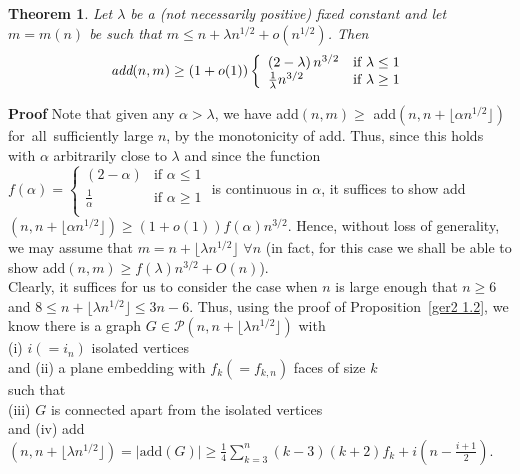 \documentclass{article}
\newtheorem{Theorem}{Theorem}
\newtheorem{Proof of Theorem}{Proof of Theorem}
\begin{document}
\begin{Theorem} \label{add3}
Let $\lambda$ be a (not necessarily positive) fixed constant and 
let $m=m(n)$ be such that $m \leq n + \lambda n^{1/2} + o(n^{1/2})$. 
Then
\begin{displaymath}
\emph{add}(n,m) \geq (1+o(1))
\left\{ \begin{array}{ll}
\left( 2 - \lambda \right) n^{3/2} & \textrm{if } \lambda \leq 1 \\
\frac{1}{\lambda} n^{3/2} & \textrm{if } \lambda \geq 1 \\
\end{array} \right. 
\end{displaymath}
\end{Theorem}
\textbf{Proof} 
Note that given any $\alpha > \lambda$, 
we have add$(n,m) \geq$ add$(n,n + \lfloor \alpha n^{1/2} \rfloor )$
for~all~sufficiently large $n$,
by the monotonicity of add.
Thus, since this holds with $\alpha$ arbitrarily close to $\lambda$ and since 
the function
$f(\alpha) = \left\{ \begin{array}{ll}
\left( 2 - \alpha \right) & \textrm{if } \alpha \leq 1 \\
\frac{1}{\alpha} & \textrm{if } \alpha \geq 1 \\
\end{array} \right.$
is continuous in $\alpha$,
it suffices to show add$(n,n + \lfloor \alpha n^{1/2} \rfloor) \geq (1+o(1)) f(\alpha)n^{3/2}$.
Hence, without loss of generality, we may assume that
$m=n + \lfloor \lambda n^{1/2} \rfloor$ $\forall n$
(in fact, for this case we shall be able to show add$(n,m) \geq f(\lambda)n^{3/2} + O(n)$). \\

Clearly, it suffices for us to consider the case when $n$ is large enough that 
$n \geq 6$ and $8 \leq n+ \lfloor \lambda n^{1/2} \rfloor \leq 3n-6$.
Thus, using the proof of Proposition~\ref{ger2 1.2},
we know there is a graph $G \in \mathcal{P}(n,n +\lfloor \lambda n^{1/2} \rfloor)$ with \\
(i) $i(=i_{n})$ isolated vertices \\
and (ii) a plane embedding with $f_{k}(=f_{k,n})$ faces of size $k$ \\
such that \\
(iii) $G$ is connected apart from the isolated vertices \\
and (iv) add$(n,n+\lfloor \lambda n^{1/2} \rfloor) = |\textrm{add}(G)| \geq 
\frac{1}{4} \sum_{k=3}^{n}(k-3)(k+2)f_{k} +i(n- \frac{i+1}{2})$. \\
\end{document}
